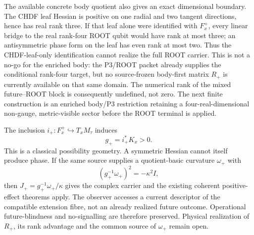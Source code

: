 \documentclass[11pt]{article}
\begin{document}
The available concrete body quotient also gives an exact dimensional
boundary.  The CHDF leaf Hessian is positive on one radial and two tangent
directions, hence has real rank three.  If that leaf alone were identified
with $F_x^+$, every linear bridge to the real rank-four ROOT qubit would have
rank at most three; an antisymmetric phase form on the leaf has even rank at
most two.  Thus the CHDF-leaf-only identification cannot realize the full
ROOT carrier.  This is not a no-go for the enriched body: the P3/ROOT packet
already supplies the conditional rank-four target, but no source-frozen
body-first matrix $R_+$ is currently available on that same domain.  The
numerical rank of the mixed future--ROOT block is consequently undefined,
not zero.  The next finite construction is an enriched body/P3 restriction
retaining a four-real-dimensional non-gauge, metric-visible sector before
the ROOT terminal is applied.

The inclusion $i_+:F_x^+\hookrightarrow T_xM_\tau$ induces
\begin{equation}
 g_+=i_+^*K_x>0.
 \label{eq:future-fibre-metric}
\end{equation}
This is a classical possibility geometry. A symmetric Hessian cannot itself
produce phase. If the same source supplies a quotient-basic curvature
$\omega_+$ with
\begin{equation}
 (g_+^{-1}\omega_+)^2=-\kappa^2I,
 \label{eq:future-phase-lock}
\end{equation}
then $J_+=g_+^{-1}\omega_+/\kappa$ gives the complex carrier and the existing
coherent positive-effect theorems apply. The observer accesses a current
descriptor of the compatible extension fibre, not an already realized future
outcome. Operational future-blindness and no-signalling are therefore
preserved. Physical realization of $R_+$, its rank advantage and the common
source of $\omega_+$ remain open.
\end{document}
